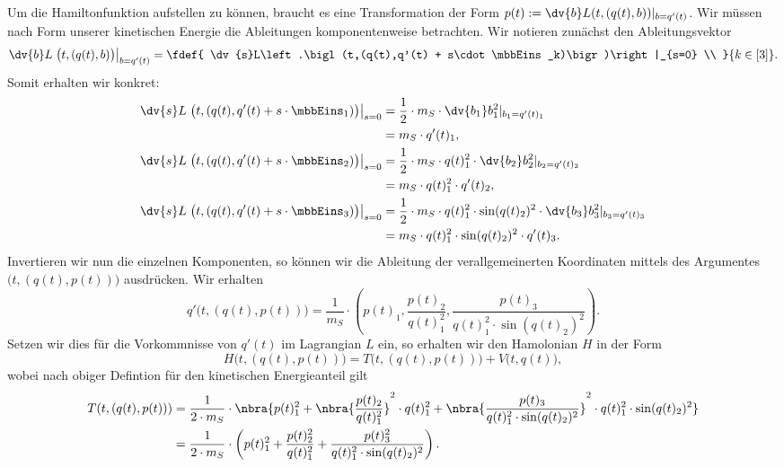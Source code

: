 \documentclass{subfiles}
\begin{document}
    Um die Hamiltonfunktion aufstellen zu können, braucht es eine Transformation der Form $p(t):=\dv{b}L(t,(q(t),b))|_{b=q'(t)}$.
    Wir müssen nach Form unserer kinetischen Energie die Ableitungen komponentenweise betrachten. Wir notieren zunächst den Ableitungsvektor
    \[
        \dv{b}L\left.\bigl(t,(q(t),b)\bigr)\right|_{b=q'(t)} = \fdef{
            \dv{s}L\left.\bigl(t,(q(t),q'(t) + s\cdot\mbbEins_k)\bigr)\right|_{s=0} \\
        }{k\in[3]}.
    \]
    Somit erhalten wir konkret:
    \begin{align*}
        \dv{s}L\left.\bigl(t,(q(t),q'(t) + s\cdot\mbbEins_1)\bigr)\right|_{s=0} &= \frac12\cdot m_S\cdot\dv{b_1}b_1^2|_{b_1 = q'(t)_1}\\
        &= m_S\cdot q'(t)_1, \\
        \dv{s}L\left.\bigl(t,(q(t),q'(t) + s\cdot\mbbEins_2)\bigr)\right|_{s=0} &= \frac12\cdot m_S\cdot q(t)_1^2\cdot\dv{b_2}b_2^2|_{b_2 = q'(t)_2} \\
        &= m_S\cdot q(t)_1^2\cdot q'(t)_2,\\
        \dv{s}L\left.\bigl(t,(q(t),q'(t) + s\cdot\mbbEins_3)\bigr)\right|_{s=0} &= \frac12\cdot m_S\cdot q(t)_1^2\cdot\sin(q(t)_2)^2\cdot\dv{b_3}b_3^2|_{b_3 = q'(t)_3} \\
        &= m_S\cdot q(t)_1^2\cdot\sin(q(t)_2)^2\cdot q'(t)_3.
    \end{align*}
    Invertieren wir nun die einzelnen Komponenten, so können wir die Ableitung der verallgemeinerten Koordinaten mittels des Argumentes $\bigl(t,(q(t),p(t))\bigr)$ ausdrücken. Wir erhalten
    \[
        q'\bigl(t,(q(t),p(t))\bigr) = \frac{1}{m_S}\cdot\left(
            p(t)_1,
            \frac{p(t)_2}{q(t)_1^2},
            \frac{p(t)_3}{q(t)_1^2\cdot\sin(q(t)_2)^2}
        \right).
    \]
    Setzen wir dies für die Vorkommnisse von $q'(t)$ im Lagrangian $L$ ein, so erhalten wir den Hamolonian $H$ in der Form
    \[
        H\bigl(t,(q(t),p(t))\bigr) = T\bigl(t,(q(t),p(t))\bigr) + V\bigl(t,q(t)\bigr),
    \]
    wobei nach obiger Defintion für den kinetischen Energieanteil gilt
    \begin{align*}
        T(t,(q(t),p(t))) &= \frac{1}{2\cdot m_S}\cdot\nbra{
            p(t)_1^2 + \nbra{
                \frac{p(t)_2}{q(t)_1^2}
            }^2\cdot q(t)_1^2 + \nbra{
                \frac{p(t)_3}{q(t)_1^2\cdot\sin(q(t)_2)^2}
            }^2\cdot q(t)_1^2\cdot\sin(q(t)_2)^2
        } \\
        &= \frac{1}{2\cdot m_S}\cdot\left(
            p(t)_1^2 + \frac{p(t)_2^2}{q(t)_1^2} + \frac{p(t)_3^2}{q(t)_1^2\cdot\sin(q(t)_2)^2}
        \right).
    \end{align*}
\end{document}
